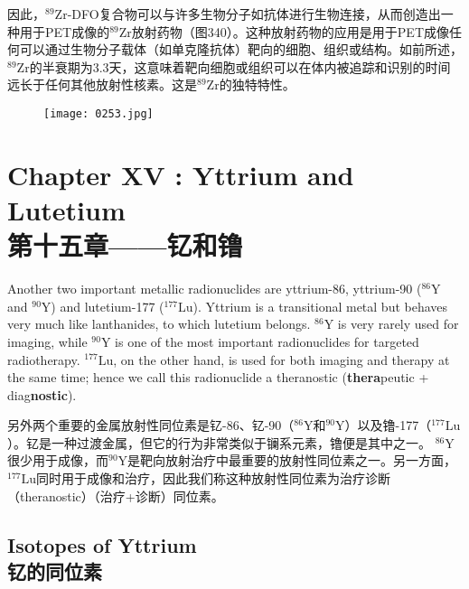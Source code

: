 \documentclass[dvipsnames, svgnames,a4paper,11pt]{article}
\begin{document}
因此，\(\mathrm{^{89}Zr}\)-DFO复合物可以与许多生物分子如抗体进行生物连接，从而创造出一种用于PET成像的\(\mathrm{^{89}Zr}\)放射药物（图340）。这种放射药物的应用是用于PET成像任何可以通过生物分子载体（如单克隆抗体）靶向的细胞、组织或结构。如前所述，\(\mathrm{^{89}Zr}\)的半衰期为3.3天，这意味着靶向细胞或组织可以在体内被追踪和识别的时间远长于任何其他放射性核素。这是\(\mathrm{^{89}Zr}\)的独特特性。

\begin{figure}[h]
	\centering
    \texttt{[image: 0253.jpg]}  
     \label{fig340}
\end{figure}

\newpage


\section{Chapter XV :   Yttrium and Lutetium \\第十五章——钇和镥}

Another two important metallic radionuclides are yttrium-86, yttrium-90 (\(\mathrm{^{86}Y}\) and \(\mathrm{^{90}Y}\)) and lutetium-177 (\(\mathrm{^{177}Lu}\)). Yttrium is a transitional metal but behaves very much like lanthanides, to which lutetium belongs. \(\mathrm{^{86}Y}\) is very rarely used for imaging, while \(\mathrm{^{90}Y}\) is one of the most important radionuclides for targeted radiotherapy. \(\mathrm{^{177}Lu}\), on the other hand, is used for both imaging and therapy at the same time; hence we call this radionuclide a theranostic (\textbf{thera}peutic + diag\textbf{nostic}).

另外两个重要的金属放射性同位素是钇-86、钇-90（\(\mathrm{^{86}Y}\)和\(\mathrm{^{90}Y}\)）以及镥-177（\(\mathrm{^{177}Lu}\)）。钇是一种过渡金属，但它的行为非常类似于镧系元素，镥便是其中之一。 \(\mathrm{^{86}Y}\)很少用于成像，而\(\mathrm{^{90}Y}\)是靶向放射治疗中最重要的放射性同位素之一。另一方面，\(\mathrm{^{177}Lu}\)同时用于成像和治疗，因此我们称这种放射性同位素为治疗诊断（theranostic）（治疗+诊断）同位素。

\subsection{Isotopes of Yttrium\\ 钇的同位素}  
\end{document}
